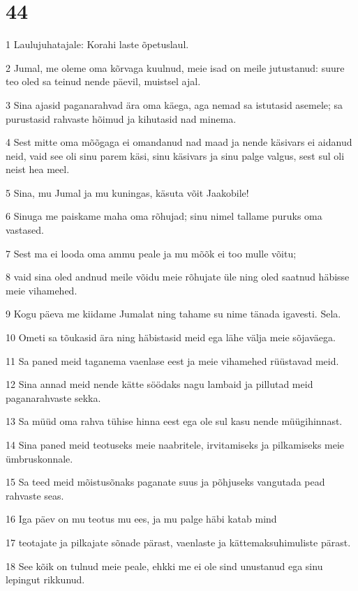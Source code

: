 \chapter{44}

\par 1 Laulujuhatajale: Korahi laste õpetuslaul.
\par 2 Jumal, me oleme oma kõrvaga kuulnud, meie isad on meile jutustanud: suure teo oled sa teinud nende päevil, muistsel ajal.
\par 3 Sina ajasid paganarahvad ära oma käega, aga nemad sa istutasid asemele; sa purustasid rahvaste hõimud ja kihutasid nad minema.
\par 4 Sest mitte oma mõõgaga ei omandanud nad maad ja nende käsivars ei aidanud neid, vaid see oli sinu parem käsi, sinu käsivars ja sinu palge valgus, sest sul oli neist hea meel.
\par 5 Sina, mu Jumal ja mu kuningas, käsuta võit Jaakobile!
\par 6 Sinuga me paiskame maha oma rõhujad; sinu nimel tallame puruks oma vastased.
\par 7 Sest ma ei looda oma ammu peale ja mu mõõk ei too mulle võitu;
\par 8 vaid sina oled andnud meile võidu meie rõhujate üle ning oled saatnud häbisse meie vihamehed.
\par 9 Kogu päeva me kiidame Jumalat ning tahame su nime tänada igavesti. Sela.
\par 10 Ometi sa tõukasid ära ning häbistasid meid ega lähe välja meie sõjaväega.
\par 11 Sa paned meid taganema vaenlase eest ja meie vihamehed rüüstavad meid.
\par 12 Sina annad meid nende kätte söödaks nagu lambaid ja pillutad meid paganarahvaste sekka.
\par 13 Sa müüd oma rahva tühise hinna eest ega ole sul kasu nende müügihinnast.
\par 14 Sina paned meid teotuseks meie naabritele, irvitamiseks ja pilkamiseks meie ümbruskonnale.
\par 15 Sa teed meid mõistusõnaks paganate suus ja põhjuseks vangutada pead rahvaste seas.
\par 16 Iga päev on mu teotus mu ees, ja mu palge häbi katab mind
\par 17 teotajate ja pilkajate sõnade pärast, vaenlaste ja kättemaksuhimuliste pärast.
\par 18 See kõik on tulnud meie peale, ehkki me ei ole sind unustanud ega sinu lepingut rikkunud.
